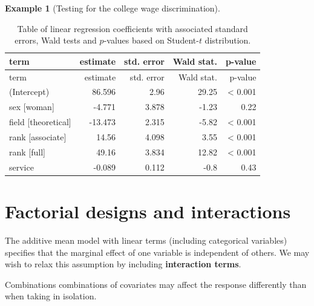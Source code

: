 \documentclass[
  11pt,
  letterpaper,
]{scrbook}
\theoremstyle{definition}
\theoremstyle{definition}
\newtheorem{example}{Example}[chapter]
\theoremstyle{plain}
\theoremstyle{plain}
\theoremstyle{remark}
\begin{document}
\begin{example}[Testing for the college wage
discrimination]
\begin{longtable}[]{@{}lrrrr@{}}
\caption{Table of linear regression coefficients with associated
standard errors, Wald tests and \(p\)-values based on Student-\(t\)
distribution.}\tabularnewline
\toprule\noalign{}
term & estimate & std. error & Wald stat. & p-value \\
\midrule\noalign{}
\endfirsthead
\toprule\noalign{}
term & estimate & std. error & Wald stat. & p-value \\
\midrule\noalign{}
\endhead
\bottomrule\noalign{}
\endlastfoot
(Intercept) & 86.596 & 2.96 & 29.25 & \textless{} 0.001 \\
sex {[}woman{]} & -4.771 & 3.878 & -1.23 & 0.22 \\
field {[}theoretical{]} & -13.473 & 2.315 & -5.82 & \textless{} 0.001 \\
rank {[}associate{]} & 14.56 & 4.098 & 3.55 & \textless{} 0.001 \\
rank {[}full{]} & 49.16 & 3.834 & 12.82 & \textless{} 0.001 \\
service & -0.089 & 0.112 & -0.8 & 0.43 \\
\end{longtable}

\end{example}

\section{Factorial designs and
interactions}\label{factorial-designs-and-interactions}

The additive mean model with linear terms (including categorical
variables) specifies that the marginal effect of one variable is
independent of others. We may wish to relax this assumption by including
\textbf{interaction terms}.

Combinations combinations of covariates may affect the response
differently than when taking in isolation.
\end{document}
